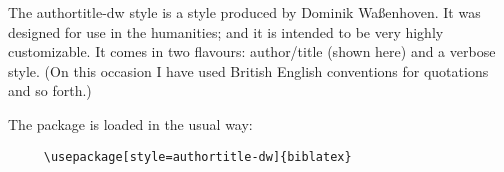 
\usepackage[style=authortitle-dw,backend=biber]{biblatex}



\renewcommand{\showingstyle}{dw-authortitle}
\usepackage[british]{babel}
%
The \textsf{authortitle-dw} style is a style produced by Dominik Waßenhoven. It was designed for use in the humanities; and it is intended to be very highly customizable. It comes in two flavours: author/title (shown here) and a verbose style. (On this occasion I have used British English conventions for quotations and so forth.)

\quad The package is loaded in the usual way:
\begin{verbatim}
     \usepackage[style=authortitle-dw]{biblatex}
\end{verbatim}





